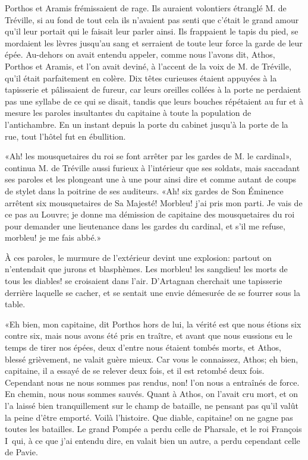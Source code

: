 Porthos et Aramis frémissaient de rage. Ils auraient volontiers étranglé M. de Tréville, si au fond de tout cela ils n'avaient pas senti que c'était le grand amour qu'il leur portait qui le faisait leur parler ainsi. Ils frappaient le tapis du pied, se mordaient les lèvres jusqu'au sang et serraient de toute leur force la garde de leur épée. Au-dehors on avait entendu appeler, comme nous l'avons dit, Athos, Porthos et Aramis, et l'on avait deviné, à l'accent de la voix de M. de Tréville, qu'il était parfaitement en colère. Dix têtes curieuses étaient appuyées à la tapisserie et pâlissaient de fureur, car leurs oreilles collées à la porte ne perdaient pas une syllabe de ce qui se disait, tandis que leurs bouches répétaient au fur et à mesure les paroles insultantes du capitaine à toute la population de l'antichambre. En un instant depuis la porte du cabinet jusqu'à la porte de la rue, tout l'hôtel fut en ébullition. 

«Ah! les mousquetaires du roi se font arrêter par les gardes de M. le cardinal», continua M. de Tréville aussi furieux à l'intérieur que ses soldats, mais saccadant ses paroles et les plongeant une à une pour ainsi dire et comme autant de coups de stylet dans la poitrine de ses auditeurs. «Ah! six gardes de Son Éminence arrêtent six mousquetaires de Sa Majesté! Morbleu! j'ai pris mon parti. Je vais de ce pas au Louvre; je donne ma démission de capitaine des mousquetaires du roi pour demander une lieutenance dans les gardes du cardinal, et s'il me refuse, morbleu! je me fais abbé.» 

À ces paroles, le murmure de l'extérieur devint une explosion: partout on n'entendait que jurons et blasphèmes. Les morbleu! les sangdieu! les morts de tous les diables! se croisaient dans l'air. D'Artagnan cherchait une tapisserie derrière laquelle se cacher, et se sentait une envie démesurée de se fourrer sous la table. 

«Eh bien, mon capitaine, dit Porthos hors de lui, la vérité est que nous étions six contre six, mais nous avons été pris en traître, et avant que nous eussions eu le temps de tirer nos épées, deux d'entre nous étaient tombés morts, et Athos, blessé grièvement, ne valait guère mieux. Car vous le connaissez, Athos; eh bien, capitaine, il a essayé de se relever deux fois, et il est retombé deux fois. Cependant nous ne nous sommes pas rendus, non! l'on nous a entraînés de force. En chemin, nous nous sommes sauvés. Quant à Athos, on l'avait cru mort, et on l'a laissé bien tranquillement sur le champ de bataille, ne pensant pas qu'il valût la peine d'être emporté. Voilà l'histoire. Que diable, capitaine! on ne gagne pas toutes les batailles. Le grand Pompée a perdu celle de Pharsale, et le roi François I\ier\, qui, à ce que j'ai entendu dire, en valait bien un autre, a perdu cependant celle de Pavie. 

